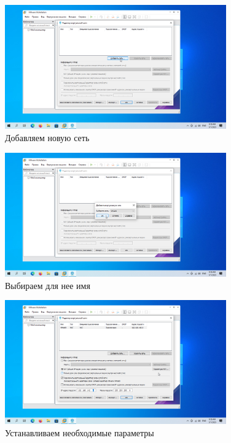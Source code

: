 \documentclass[a4paper]{article}
\begin{document}
  \begin{figure}[H]
    \centering
    \includegraphics[width=0.85\textwidth]{9_0003}
    \caption{Добавляем новую сеть}
    \label{img:0003}
  \end{figure}

  \begin{figure}[H]
    \centering
    \includegraphics[width=0.85\textwidth]{9_0004}
    \caption{Выбираем для нее имя}
    \label{img:0004}
  \end{figure}

  \begin{figure}[H]
    \centering
    \includegraphics[width=0.85\textwidth]{9_0005}
    \caption{Устанавливаем необходимые параметры}
    \label{img:0005}
  \end{figure}
\end{document}

